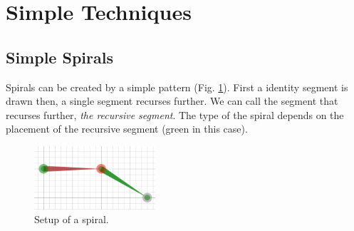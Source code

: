 \section{Simple Techniques}
    \subsection{Simple Spirals}
        Spirals can be created by a simple pattern (Fig. \ref{spiral_setup_01}).
        First a identity segment is drawn then, a single segment recurses further.
        We can call the segment that recurses further, \emph{the recursive segment}.
        The type of the spiral depends on the placement of the recursive segment (green in this case).

        \begin{figure}[ht]
            \caption{\label{spiral_setup_01} Setup of a spiral.}
            \centering
            \includegraphics[width=0.4\textwidth]{img/Simple_Techniques/Spirals/spiral_setup_01.png}
        \end{figure}

